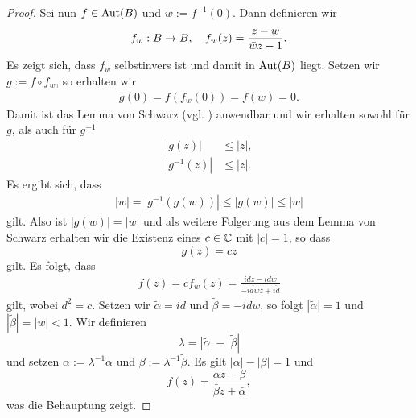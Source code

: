\begin{proof}
  Sei nun $f \in \operatorname{Aut}(B)$ und $w := f^{-1}(0)$. Dann definieren wir
  \[
  f_w : B \rightarrow B, \quad f_w(z) = \frac{z -w}{\bar w z - 1}.
  \]
  Es zeigt sich, dass $f_w$ selbstinvers ist und damit in $\operatorname{Aut}(B)$
  liegt. Setzen wir $g := f\circ f_w$, so erhalten wir
  \begin{align*}
    g(0) = f( f_w(0)) = f(w) = 0.
  \end{align*}
  Damit ist das Lemma von Schwarz (vgl. \cite[Satz 5.10]{Kas})
  anwendbar und wir erhalten sowohl für $g$, als auch für $g^{-1}$
  \begin{align*}
    |g(z)| & \leq |z|, \\
    |g^{-1}(z)| & \leq |z|.
  \end{align*}
  Es ergibt sich, dass
  \begin{align*}
    |w| = |g^{-1}(g(w))| \leq |g(w)| \leq |w|
  \end{align*}
  gilt. Also ist $|g(w)| = |w|$ und als weitere Folgerung aus dem Lemma
  von Schwarz erhalten wir die Existenz eines $c \in \mathbb{C}$ mit $|c| =
  1$, so dass
  \[
  g(z) = cz
  \]
  gilt. Es folgt, dass
  \begin{align*}
    f(z) = c f_w(z) = \frac{i dz - i dw}{ - \overline{idw} z +
      \overline{i d}}
  \end{align*}
  gilt, wobei $d^2 = c$. Setzen wir $\tilde \alpha = i d$ und $\tilde
  \beta = - i d w$, so folgt $|\tilde \alpha| = 1$ und $|\tilde \beta|
  = |w| < 1$. Wir definieren
  \[
  \lambda = |\tilde \alpha| - |\tilde \beta|
  \]
  und setzen $\alpha := \lambda^{-1} \tilde \alpha$ und $\beta :=
  \lambda^{-1} \tilde \beta$. Es gilt $|\alpha| - |\beta| = 1$ und
  \[
  f(z) = \frac{\alpha z - \beta}{\bar \beta z  + \bar \alpha},
  \]
  was die Behauptung zeigt.


\end{proof}
